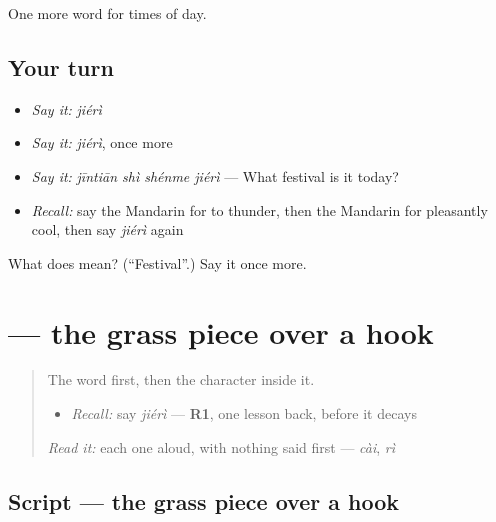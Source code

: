 \begin{grammarlens}[title={What you've built}]
One more word for times of day.
\end{grammarlens}

\subsection*{Your turn}
\begin{itemize}
\raggedright
  \item \emph{Say it:} \emph{jiérì}
  \item \emph{Say it:} \emph{jiérì}, once more
  \item \emph{Say it:} \emph{jīntiān shì shénme jiérì} — What festival is it today?
  \item \emph{Recall:} say the Mandarin for to thunder, then the Mandarin for pleasantly cool, then say \emph{jiérì} again
\end{itemize}

\begin{tcolorbox}[breakable,colback=teal!4,colframe=teal!35!black,title={Before you move on}]
What does  mean? (\textquotedblleft{}Festival\textquotedblright{}.) Say it once more.
\end{tcolorbox}
\section[\texorpdfstring{\zh{节} (jié)}{节 (jié)}]{ — the grass piece over a hook}

\label{lesson:ZH-W137-jie-joint}



\begin{quote}
The word first, then the character inside it.

\begin{itemize}
\raggedright
  \item \emph{Recall:} say \emph{jiérì} — \textbf{R1}, one lesson back, before it decays
\end{itemize}

\begin{quote}
 
\end{quote}

\emph{Read it:} each one aloud, with nothing said first — \emph{cài}, \emph{rì}
\end{quote}

\subsection*{Script — the grass piece over a hook}

